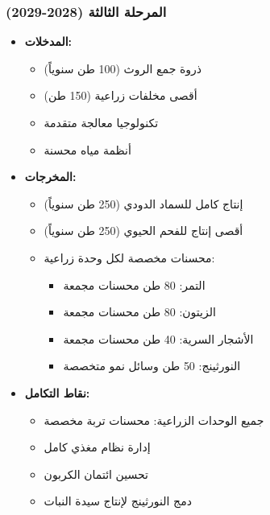\subsubsection{المرحلة الثالثة (2028-2029)}
\begin{itemize}
    \item \textbf{المدخلات:}
    \begin{itemize}
        \item ذروة جمع الروث (100 طن سنوياً)
        \item أقصى مخلفات زراعية (150 طن)
        \item تكنولوجيا معالجة متقدمة
        \item أنظمة مياه محسنة
    \end{itemize}
    \item \textbf{المخرجات:}
    \begin{itemize}
        \item إنتاج كامل للسماد الدودي (250 طن سنوياً)
        \item أقصى إنتاج للفحم الحيوي (250 طن سنوياً)
        \item محسنات مخصصة لكل وحدة زراعية:
        \begin{itemize}
            \item التمر: 80 طن محسنات مجمعة
            \item الزيتون: 80 طن محسنات مجمعة
            \item الأشجار السرية: 40 طن محسنات مجمعة
            \item النورثينج: 50 طن وسائل نمو متخصصة
        \end{itemize}
    \end{itemize}
    \item \textbf{نقاط التكامل:}
    \begin{itemize}
        \item جميع الوحدات الزراعية: محسنات تربة مخصصة
        \item إدارة نظام مغذي كامل
        \item تحسين ائتمان الكربون
        \item دمج النورثينج لإنتاج سيدة النبات
    \end{itemize}
\end{itemize}

